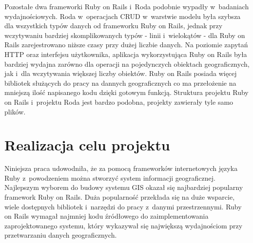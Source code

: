 \documentclass[printmode]{mgr}
\begin{document}
Pozostałe dwa frameworki Ruby on Rails i~Roda podobnie wypadły w~badaniach wydajnościowych. Roda w~operacjach CRUD w~warstwie modelu była szybsza dla wszystkich typów danych od frameworku Ruby on Rails, jednak przy wczytywaniu bardziej skomplikowanych typów - linii i~wielokątów - dla Ruby on Rails zarejestrowano niższe czasy przy dużej liczbie danych. Na poziomie zapytań HTTP oraz interfejsu użytkownika, aplikacja wykorzystująca Ruby on Rails była bardziej wydajna zarówno dla  operacji na pojedynczych obiektach geograficznych, jak i~dla wczytywania większej liczby obiektów. Ruby on Rails posiada więcej bibliotek służących do pracy na dannych geograficznych co ma przełożenie na mniejszą ilość napisanego kodu dzięki gotowym funkcją. Struktura projektu Ruby on Rails i~projektu Roda jest bardzo podobna, projekty zawierały tyle samo plików.

\section{Realizacja celu projektu}
Niniejsza praca udowodniła, że za pomocą frameworków internetowych języka Ruby z~powodzeniem można stworzyć system informacji geograficznej. Najlepszym wyborem do budowy systemu GIS okazał się najbardziej popularny framework Ruby on Rails. Duża popularność przekłada się na duże wsparcie, wiele dostępnych bibliotek i~narzędzi do pracy z~danymi przestrzennymi. Ruby on Rails wymagał najmniej kodu źródłowego do zaimplementowania zaprojektowanego systemu, który wykazywał się największą wydajnościom przy przetwarzaniu danych geograficznych.
  
\end{document}
